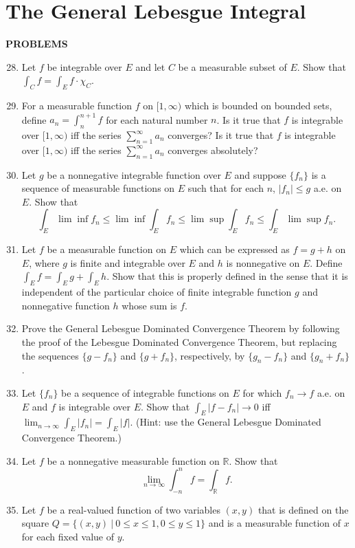 \section{The General Lebesgue Integral}
\begin{center}
	\textbf{PROBLEMS}
\end{center}
\begin{enumerate}
	\setcounter{enumi}{27}
    \item Let $f$ be integrable over $E$ and let $C$ be a measurable subset of $E$. Show that $\int_Cf=\int_Ef\cdot\chi_C$.
    \item For a measurable function $f$ on $[1,\infty)$ which is bounded on bounded sets, define $a_n=\int_n^{n+1}f$ for each natural number $n$.
    Is it true that $f$ is integrable over $[1,\infty)$ iff the series $\sum_{n=1}^\infty a_n$ converges?
    Is it true that $f$ is integrable over $[1,\infty)$ iff the series $\sum_{n=1}^\infty a_n$ converges absolutely?
    \item Let $g$ be a nonnegative integrable function over $E$ and suppose $\{f_n\}$ is a sequence of measurable functions on $E$ such that for each $n$, $|f_n|\le g$ a.e. on $E$. Show that
    \[
        \int_E\lim\inf f_n \le \lim\inf\int_E f_n \le \lim\sup\int_E f_n \le \int_E\lim\sup f_n.
    \]
    \item Let $f$ be a measurable function on $E$ which can be expressed as $f=g+h$ on $E$, where $g$ is finite and integrable over $E$ and $h$ is nonnegative on $E$.
    Define $\int_Ef=\int_Eg+\int_Eh$. Show that this is properly defined in the sense that it is independent of the particular choice of finite integrable function $g$ and nonnegative function $h$ whose sum is $f$.
    \item Prove the General Lebesgue Dominated Convergence Theorem by following the proof of the Lebesgue Dominated Convergence Theorem, but replacing the sequences $\{g-f_n\}$ and $\{g+f_n\}$, respectively, by $\{g_n-f_n\}$ and $\{g_n+f_n\}$.
    \item Let $\{f_n\}$ be a sequence of integrable functions on $E$ for which $f_n\to f$ a.e. on $E$ and $f$ is integrable over $E$. Show that $\int_E|f-f_n|\to0$ iff $\lim_{n\to\infty}\int_E|f_n|=\int_E|f|$.
    (Hint: use the General Lebesgue Dominated Convergence Theorem.)
    \item Let $f$ be a nonnegative measurable function on $\mathbb{R}$. Show that 
    \[
        \lim_{n\to\infty}\int_{-n}^nf=\int_{\mathbb{R}}f.
    \]   
    \item Let $f$ be a real-valued function of two variables $(x,y)$ that is defined on the square $Q=\{(x,y)\ |\ 0\le x\le 1,0\le y\le 1\}$ and is a measurable function of $x$ for each fixed value of $y$.

\end{enumerate}
